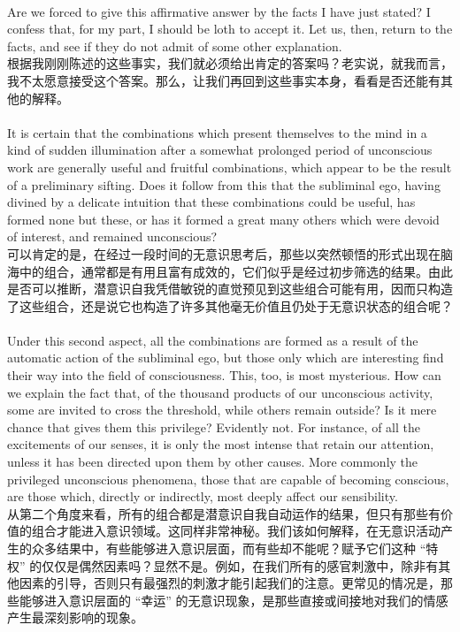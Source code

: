 \documentclass{article}
\begin{document}
\\
Are we forced to give this affirmative answer by the facts I have just stated? I confess that, for my part, I should be loth to accept it. Let us, then, return to the facts, and see if they do not admit of some other explanation.\\
根据我刚刚陈述的这些事实，我们就必须给出肯定的答案吗？老实说，就我而言，我不太愿意接受这个答案。那么，让我们再回到这些事实本身，看看是否还能有其他的解释。 \\ 

\\
It is certain that the combinations which present themselves to the mind in a kind of sudden illumination after a somewhat prolonged period of unconscious work are generally useful and fruitful combinations, which appear to be the result of a preliminary sifting. Does it follow from this that the subliminal ego, having divined by a delicate intuition that these combinations could be useful, has formed none but these, or has it formed a great many others which were devoid of interest, and remained unconscious?\\
可以肯定的是，在经过一段时间的无意识思考后，那些以突然顿悟的形式出现在脑海中的组合，通常都是有用且富有成效的，它们似乎是经过初步筛选的结果。由此是否可以推断，潜意识自我凭借敏锐的直觉预见到这些组合可能有用，因而只构造了这些组合，还是说它也构造了许多其他毫无价值且仍处于无意识状态的组合呢？ \\

\\
Under this second aspect, all the combinations are formed as a result of the automatic action of the subliminal ego, but those only which are interesting find their way into the field of consciousness. This, too, is most mysterious. How can we explain the fact that, of the thousand products of our unconscious activity, some are invited to cross the threshold, while others remain outside? Is it mere chance that gives them this privilege? Evidently not. For instance, of all the excitements of our senses, it is only the most intense that retain our attention, unless it has been directed upon them by other causes. More commonly the privileged unconscious phenomena, those that are capable of becoming conscious, are those which, directly or indirectly, most deeply affect our sensibility.\\
从第二个角度来看，所有的组合都是潜意识自我自动运作的结果，但只有那些有价值的组合才能进入意识领域。这同样非常神秘。我们该如何解释，在无意识活动产生的众多结果中，有些能够进入意识层面，而有些却不能呢？赋予它们这种 “特权” 的仅仅是偶然因素吗？显然不是。例如，在我们所有的感官刺激中，除非有其他因素的引导，否则只有最强烈的刺激才能引起我们的注意。更常见的情况是，那些能够进入意识层面的 “幸运” 的无意识现象，是那些直接或间接地对我们的情感产生最深刻影响的现象。 \\ 
\end{document}
